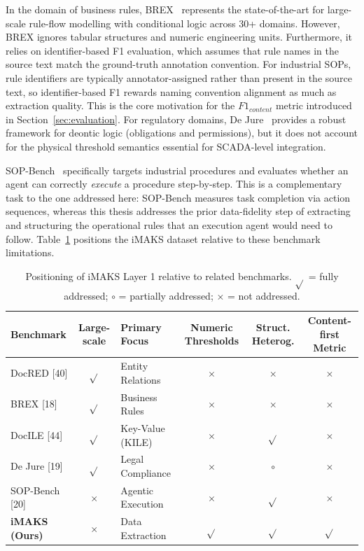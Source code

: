﻿\documentclass[11pt]{article}
\begin{document}
In the domain of business rules, BREX~\cite{yang2025brex} represents the state-of-the-art for large-scale rule-flow modelling with conditional logic across 30+ domains.
However, BREX ignores tabular structures and numeric engineering units.
Furthermore, it relies on identifier-based F1 evaluation, which assumes that rule
names in the source text match the ground-truth annotation convention.
For industrial SOPs, rule identifiers are typically annotator-assigned rather
than present in the source text, so identifier-based F1 rewards naming convention
alignment as much as extraction quality.
This is the core motivation for the $F1_{content}$ metric introduced
in Section~\ref{sec:evaluation}.
For regulatory domains, De Jure~\cite{guliani2026dejure} provides a robust framework for deontic logic (obligations and permissions), but it does not account for the physical threshold semantics essential for SCADA-level integration.

SOP-Bench~\cite{nandi2025sopbench} specifically targets industrial procedures and
evaluates whether an agent can correctly \emph{execute} a procedure step-by-step.
This is a complementary task to the one addressed here: SOP-Bench measures task
completion via action sequences, whereas this thesis addresses the prior data-fidelity step of extracting and
structuring the operational rules that an execution agent would need to follow.
Table~\ref{tab:benchmark_landscape} positions the iMAKS dataset relative to these benchmark limitations.

\begin{table}[ht]
\centering
\caption{Positioning of iMAKS Layer 1 relative to related benchmarks. $\sqrt{}$ = fully addressed; $\circ$ = partially addressed; $\times$ = not addressed.}
\label{tab:benchmark_landscape}
\begin{tabular}{l|c|p{1.5 cm}|c|c|c}
\hline
\textbf{Benchmark} & \textbf{Large-scale} & \textbf{Primary Focus} & \textbf{Numeric Thresholds} & \textbf{Struct. Heterog.} & \textbf{Content-first Metric} \\
\hline
DocRED [40] & $\sqrt{}$ & Entity Relations & $\times$ & $\times$ & $\times$ \\
BREX [18] & $\sqrt{}$ & Business Rules & $\times$ & $\times$ & $\times$ \\
DocILE [44] & $\sqrt{}$ & Key-Value (KILE) & $\times$ & $\sqrt{}$ & $\times$ \\
De Jure [19] & $\sqrt{}$ & Legal Compliance & $\times$ & $\circ$ & $\times$ \\
SOP-Bench [20] & $\times$ & Agentic Execution & $\times$ & $\sqrt{}$ & $\times$ \\
\textbf{iMAKS (Ours)} & $\times$ & Data Extraction & $\sqrt{}$ & $\sqrt{}$ & $\sqrt{}$ \\
\hline
\end{tabular}
\end{table}
\end{document}
